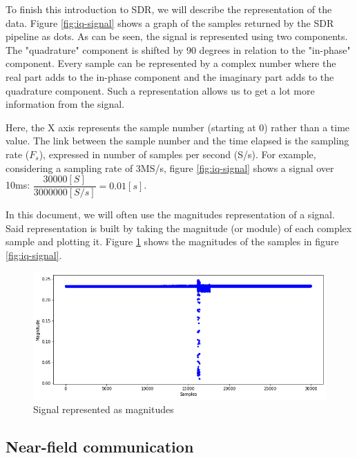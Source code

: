To finish this introduction to SDR, we will describe the representation of the data. Figure \ref{fig:iq-signal} shows a graph of the samples returned by the SDR pipeline as dots. As can be seen, the signal is represented using two components. The "quadrature" component is shifted by 90 degrees in relation to the "in-phase" component. Every sample can be represented by a complex number where the real part adds to the in-phase component and the imaginary part adds to the quadrature component. Such a representation allows us to get a lot more information from the signal. \cite{kuisma_iq, ossmann_software}

Here, the X axis represents the sample number (starting at 0) rather than a time value. The link between the sample number and the time elapsed is the sampling rate ($F_s$), expressed in number of samples per second (S/s). For example, considering a sampling rate of 3MS/s, figure \ref{fig:iq-signal} shows a signal over 10ms: $\dfrac{30000[S]}{3000000[S/s]} = 0.01[s]$.

In this document, we will often use the magnitudes representation of a signal. Said representation is built by taking the magnitude (or module) of each complex sample and plotting it. Figure \ref{fig:mag} shows the magnitudes of the samples in figure \ref{fig:iq-signal}.

\begin{figure}[htp!]
  \centering
  \includegraphics[scale=0.55]{figures/concepts_magnitudes.png}
  \caption{Signal represented as magnitudes}
  \label{fig:mag}
\end{figure}

\subsection{Near-field communication} \label{nfc}


